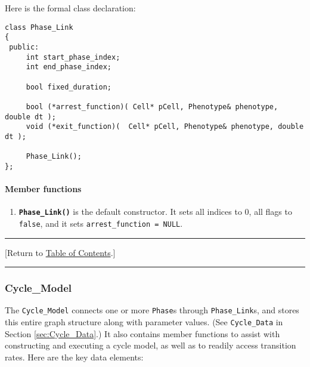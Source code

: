 \documentclass[12pt]{article}
\renewcommand{\v}{\verb}
\newcommand{\smallcode}[1]{\textbf{\texttt{#1}}}
\newcommand{\blue}[1]{\textcolor{blue}{#1}}
\newcommand{\DONE}{}%
\newcommand{\TOClink}{\begin{center}\hrule\vskip-10pt\phantom{.}\hfill[Return to \hyperlink{TOC}{Table of Contents}.]\hfill\phantom{.}\vskip3pt\hrule\end{center}}
\begin{document}
Here is the formal class declaration:
\begin{verbatim}
class Phase_Link
{
 public:
     int start_phase_index;
     int end_phase_index; 
     
     bool fixed_duration; 
     
     bool (*arrest_function)( Cell* pCell, Phenotype& phenotype, double dt ); 
     void (*exit_function)(  Cell* pCell, Phenotype& phenotype, double dt ); 
     
     Phase_Link(); 
};
\end{verbatim}

\paragraph{Member functions}
\begin{enumerate}
\item
\smallcode{Phase\_Link()} is the default constructor. It sets all indices to 0, 
all flags to \v|false|, and it sets \hfill\break \v|arrest_function = NULL|. 
\end{enumerate}

\TOClink 

\subsubsection{Cycle\_Model \DONE}
\label{sec:Cycle_Model}
The \v|Cycle_Model| connects one or more \v|Phase|s through 
\v|Phase_Link|s, and stores this entire graph structure along with 
parameter values. (See \v|Cycle_Data| in 
Section \ref{sec:Cycle_Data}.) 
It also contains member functions to assist with constructing and executing 
a cycle model, as well as to readily access transition rates. 
Here are the key  data elements: 
\end{document}
